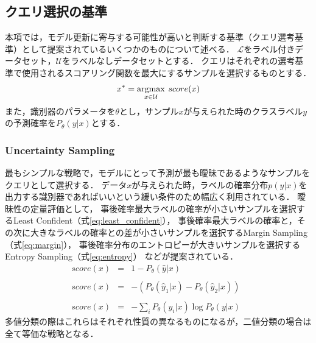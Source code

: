 \subsection{クエリ選択の基準}
\label{query_strategy}
本項では，モデル更新に寄与する可能性が高いと判断する基準（クエリ選考基準）として提案されているいくつかのものについて述べる．
$\mathcal{L}$をラベル付きデータセット，$\mathcal{U}$をラベルなしデータセットとする．
クエリはそれぞれの選考基準で使用されるスコアリング関数を最大にするサンプルを選択するものとする．
\begin{eqnarray}
    x^{*} = \argmax_{x \in \mathcal{U}} \: score(x)
\end{eqnarray}
また，識別器のパラメータを$\theta$とし，サンプル$x$が与えられた時のクラスラベル$y$の予測確率を$P_{\theta}(y|x)$とする．

\subsubsection{Uncertainty Sampling \cite{lewis1994sequential}} 
最もシンプルな戦略で，モデルにとって予測が最も曖昧であるようなサンプルをクエリとして選択する．
データ$x$が与えられた時，ラベルの確率分布$p(y|x)$を出力する識別器であればいいという緩い条件のため幅広く利用されている．
曖昧性の定量評価として，
事後確率最大ラベルの確率が小さいサンプルを選択するLeast Confident（式\ref{eq:least_confident}），
事後確率最大ラベルの確率と，その次に大きなラベルの確率との差が小さいサンプルを選択するMargin Sampling（式\ref{eq:margin}），
事後確率分布のエントロピーが大きいサンプルを選択するEntropy Sampling（式\ref{eq:entropy}）
などが提案されている．
\begin{eqnarray}
    score(x) &=& 1 - P_{\theta}(\hat{y}|x)  \;\;  \label{eq:least_confident} \\ \nonumber \\ 
    score(x) &=& - (P_{\theta}(\hat{y}_1|x) - P_{\theta}(\hat{y}_2|x) )  \;\;  \label{eq:margin}\\ \nonumber \\
    score(x) &=& - \sum_i {P_{\theta}(y_i|x)} \log P_{\theta}(y|x)  \;\;  \label{eq:entropy}
\end{eqnarray}
多値分類の際はこれらはそれぞれ性質の異なるものになるが，二値分類の場合は全て等価な戦略となる．

